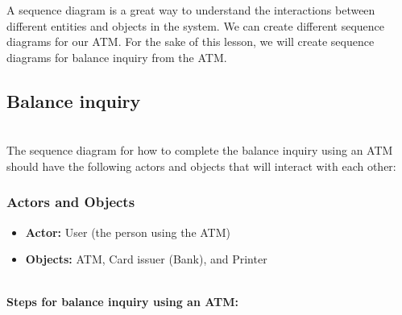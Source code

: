 

A sequence diagram is a great way to understand the interactions between different entities and objects in the system. We can create different sequence diagrams for our ATM. For the sake of this lesson, we will create sequence diagrams for balance inquiry from the ATM.

\subsection{Balance inquiry}\label{big_wh-U2Nlmtt5ghxgtf}
\\
The sequence diagram for how to complete the balance inquiry using an ATM should have the following actors and objects that will interact with each other:

\subsubsection{Actors and Objects}\label{peSSJMXPDoU2-c1QKH_qi}

\begin{itemize}
\item
\protect{}\label{qHi5YcXC9piM8WjnzcZZd}
\textbf{Actor:} User (the person using the ATM)
\item
\protect{}\label{2JuYtAHjx7IlOCLeZ1R3h}
\textbf{Objects:} ATM, Card issuer (Bank), and Printer
\end{itemize}
\\
\textbf{Steps for balance inquiry using an ATM:}

